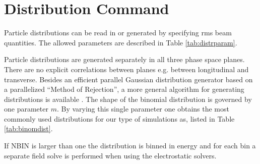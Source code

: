 \chapter{Distribution Command}
\label{chp:distribution}
Particle distributions can be read in or generated by specifying rms beam quantities.
The allowed parameters are described in Table \ref{tab:distrparam}.

Particle distributions are generated separately in all three phase space planes.
There are no explicit correlations between planes e.g. between longitudinal and transverse.
Besides an efficient parallel Gaussian distribution generator based on a parallelized 
``Method of Rejection'',
a more general algorithm for generating
distributions is available \cite{JohoDist}. The shape of the binomial distribution is governed by
one parameter $m$. By varying this single parameter one obtains the most commonly 
used distributions for our
type of simulations as, listed in Table \ref{tab:binomdist}.

If NBIN is larger than one the distribution is binned in energy and for each bin a separate field solve is
performed when using the electrostatic solvers.
 
